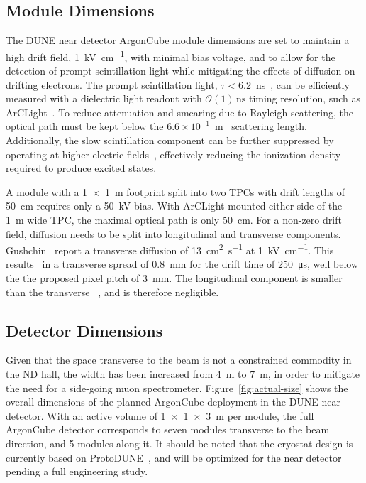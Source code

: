 \subsection{Module Dimensions}

The DUNE near detector ArgonCube module dimensions are set to maintain a high drift field, \SI{1}{\kilo\volt\per\centi\metre}, with minimal bias voltage, and to allow for the detection of prompt scintillation light while mitigating the effects of diffusion on drifting electrons.
The prompt scintillation light, $\tau<$\SI{6.2}{\nano\second}~\cite{Heindl:2015yaa}, can be efficiently measured with a dielectric light readout with $\mathcal{O}\left(1\right)\,\mathrm{ns}$ timing resolution, such as ArCLight~\cite{Auger:2017flc}.
To reduce attenuation and smearing due to Rayleigh scattering, the optical path must be kept below the $6.6\times10^{-1}$~m~\cite{Grace:2015yta} scattering length.  
Additionally, the slow scintillation component can be further suppressed by operating at higher electric fields~\cite{PhysRevB.20.3486}, effectively reducing the ionization density~\cite{PhysRevB.27.5279} required to produce excited states. 

A module with a \SI{1x1}{\metre} footprint split into two TPCs with drift lengths of \SI{50}{\centi\metre} requires only a \SI{50}{\kilo\volt} bias.
With ArCLight mounted either side of the \SI{1}{\metre} wide TPC, the maximal optical path is only \SI{50}{\centi\metre}.
For a non-zero drift field, diffusion needs to be split into longitudinal and transverse components. Gushchin~\cite{gushchin} report a transverse diffusion of \SI{13}{\centi\metre\squared\per\second} at \SI{1}{\kilo\volt\per\centi\metre}.
This results~\cite{lngDet} in a transverse spread of \SI{0.8}{\milli\metre} for the drift time of \SI{250}{\micro\second}, well below the the proposed pixel pitch of \SI{3}{\milli\metre}.
The longitudinal component is smaller than the transverse ~\cite{lngDet},  and is therefore negligible.

\subsection{Detector Dimensions}
\label{sec:det_dimensions}

Given that the space transverse to the beam is not a constrained commodity in the ND hall, the width has been increased from \SI{4}{\metre} to \SI{7}{\metre}, in order to mitigate the need for a side-going muon spectrometer.
Figure~\ref{fig:actual-size} shows the overall dimensions of the planned ArgonCube deployment in the DUNE near detector. 
With an active volume of \SI{1x1x3}{\metre} per module, the full ArgonCube detector corresponds to seven modules transverse to the beam direction, and 5 modules along it. 
It should be noted that the cryostat design is currently based on ProtoDUNE~\cite{Abi:2017aow}, and will be optimized for the near detector pending a full engineering study.  

